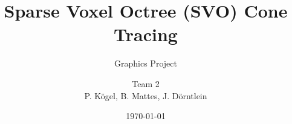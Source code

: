 \documentclass{beamer}
\title{Sparse Voxel Octree (SVO) Cone Tracing}
\subtitle{Graphics Project}
\author{Team 2\\P. Kögel, B. Mattes, J. Dörntlein}
\date{\today}
\begin{document}
\frame{\titlepage}

\newcommand{\slide}[2]{\frame{\frametitle{#1} #2}}
\newcommand{\topic}[1]{\frame{\begin{center}\huge\rm\textbf{#1}\end{center}}}






\end{document}

